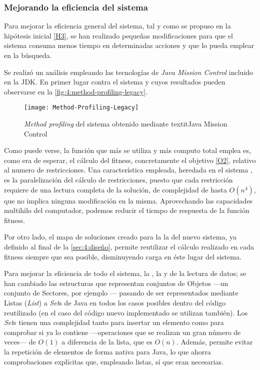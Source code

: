 \subsubsection{Mejorando la eficiencia del sistema}
\label{sec:4:mejorando-eficiencia}

Para mejorar la eficiencia general del sistema, tal y como se propuso en la hipótesis inicial \ref{H3}, se han realizado pequeñas modificaciones para que el sistema consuma menos tiempo en determinadas acciones y que lo pueda emplear en la búsqueda.

Se realizó un análisis empleando las tecnologías de \textit{Java Mission Control} incluido en la JDK. En primer lugar contra el sistema \legacy{} y cuyos resultados pueden observarse en la \autoref{fig:4:method-profiling-legacy}.

\begin{figure}
	\centering
	\texttt{[image: Method-Profiling-Legacy]}
	\caption{\textit{Method profiling} del sistema \legacy{} obtenido mediante textit{Java Mission Control}}
	\label{fig:4:method-profiling-legacy}
\end{figure}

Como puede verse, la función que más se utiliza y más computo total emplea es, como era de esperar, el cálculo del fitness, concretamente el objetivo \ref{O2}, relativo al numero de restricciones. Una característica empleada, heredada en el sistema \legacy{}, es la paralelización del cálculo de restricciones, puesto que cada restricción requiere de una lectura completa de la solución, de complejidad de hasta $O(n^4)$, que no implica ninguna modificación en la misma. Aprovechando las capacidades multihilo del computador, podemos reducir el tiempo de respuesta de la función fitness. 

Por otro lado, el mapa de soluciones creado para la la \fasedos{} del nuevo sistema, ya definido al final de la \autoref{sec:4:diseño}, permite reutilizar el cálculo realizado en cada fitness siempre que sea posible, disminuyendo carga en éste lugar del sistema. 

Para mejorar la eficiencia de todo el sistema, la \faseuno{}, la \fasedos{} y de la lectura de datos; se han cambiado las estructuras que representan conjuntos de Objetos ---un conjunto de Sectores, por ejemplo --- pasando de ser representados mediante Listas (\textit{List}) a \textit{Set}s de Java en todos los casos posibles dentro del código \legacy{} reutilizado (en el caso del código nuevo implementado se utilizan también). Los \textit{Set}s tienen una complejidad tanto para insertar un elemento como para comprobar si ya lo contiene ---operaciones que se realizan un gran número de veces--- de $O(1)$ a diferencia de la lista, que es $O(n)$. Además, permite evitar la repetición de elementos de forma nativa para Java, lo que ahorra comprobaciones explícitas que, empleando listas, sí que eran necesarias.

